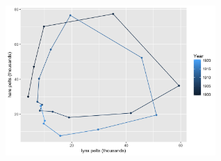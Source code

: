 \documentclass[10pt]{report}
\begin{document}
%
\vspace*{6pt}
\begin{center}
\includegraphics[width=0.6\textwidth]{img/hare-lynx-pelts-2.png}
\end{center}

%
\end{document}

